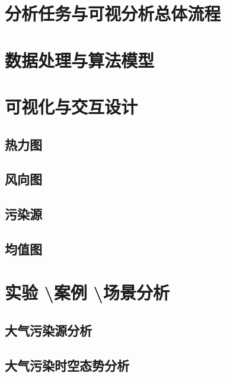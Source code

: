 \documentclass[UTF8]{ctexrep}
\begin{document}
    \section{分析任务与可视分析总体流程}

    \section{数据处理与算法模型}

    \section{可视化与交互设计}

    \subsection{热力图}
    

    \subsection{风向图}

    \subsection{污染源}

    \subsection{均值图}

    \section{实验 \textbackslash 案例 \textbackslash 场景分析}

    \subsection{大气污染源分析}

    \subsection{大气污染时空态势分析}
\end{document}
